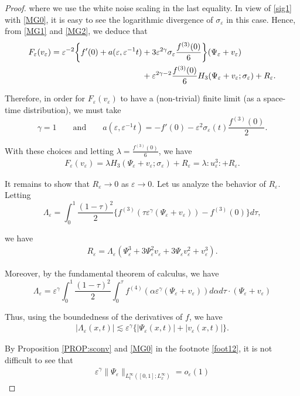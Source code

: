 \documentclass[letterpaper, 11pt,  reqno]{amsart}
\newcommand{\1}{\hspace{0.5mm}\text{I}\hspace{0.5mm}}
\newcommand{\noi}{\noindent}
\newcommand{\al}{\alpha}
\newcommand{\eps}{\varepsilon}
\newcommand{\g}{\gamma}
\newcommand{\ld}{\lambda}
\newcommand{\Ld}{\Lambda}
\newcommand{\s}{\sigma}
\newcommand{\les}{\lesssim}
\numberwithin{equation}{section}
\numberwithin{theorem}{section}
\begin{document}
\begin{proof}
{\noi
where we use the white noise scaling in the last equality.
In view of \eqref{sig1} with \eqref{MG0}, it is easy to see 
the logarithmic divergence of $\s_\eps$ in this case.}
Hence, from \eqref{MG1} and \eqref{MG2}, we deduce that 
\begin{align*}
 F_{\eps} (v_{\eps}) = \eps^{- 2} \bigg\{ f' (0) + a (\eps, \eps^{-1} t) 
 & + 3 \eps^{2 \gamma} \sigma_{\eps}
\frac{f^{(3)} (0)}{6} \bigg\} (\Psi_{\eps} + v_{\eps}) \notag\\ 
& +\eps^{2 \gamma - 2}  \frac{f^{(3)} (0)}{6} H_3 (\Psi_{\eps} +v_{\eps}; \sigma_{\eps}) + R_{\eps}. 
\end{align*}

\noi
Therefore,  in order for $F_{\eps} (v_{\eps})$ to have a (non-trivial) 
finite limit (as a space-time distribution),  we must take
\[ \g = 1
   \qquad \text{and}\qquad 
   a (\eps, \eps^{-1} t) = - f' (0) - \eps^{2}
   \sigma_{\eps} (t) \frac{f^{(3)} (0)}{2}. \]


\noi
With these choices and letting 
$\ld =\frac{f^{(3)} (0)}{6} $,  we have
\begin{align*}
 F_{\eps} (v_{\eps}) 
= \lambda H_3 (\Psi_{\eps} +   v_{\eps}; \sigma_{\eps}) + R_\eps
 = \ld  :\! u_\eps^3\!: + R_\eps. 
\end{align*}


It remains to show that $R_\eps \to 0$ as $\eps \to 0$.
Let us analyze the behavior of $R_{\eps}$. Letting
\[ \Ld_\eps = \int_0^1 \frac{(1 - \tau)^2}{2}  \big\{f^{(3)} (\tau
   \eps^\g (\Psi_{\eps} + v_{\eps})) - f^{(3)} (0)\big\}
d \tau, \]

\noi
we have
\begin{align}
	 R_{\eps} = \Lambda_{\eps}  (\Psi_{\eps}^3 + 3
   \Psi_{\eps}^2 v_{\eps} + 3 \Psi_{\eps}
   v_{\eps}^2 + v_{\eps}^3). 
\label{MG4}
\end{align}

\noi
Moreover, by the fundamental theorem of calculus, we have
\[ \Ld_\eps = \eps^\g \int_0^1 \frac{(1 -   \tau)^2}{2} 
\int_0^\tau f^{(4)} (\al  \eps^{\gamma} (\Psi_{\eps} +   v_{\eps}))d\al d \tau 
\cdot (\Psi_{\eps} + v_{\eps}) \]

\noi
Thus, using the boundedness of the derivatives of $f$,  we have
\begin{align} 
| \Ld_\eps (x, t) | \les \eps^{\gamma} 
\big\{|    \Psi_{\eps} (x, t) | + | v_{\eps} (x, t) |\big\} . 
\label{MG5}
\end{align}


By Proposition \ref{PROP:sconv} and \eqref{MG0} in the footnote \ref{foot12}, 
 it is not difficult to see that
\begin{align}
 \eps^{\gamma} \| \Psi_{\eps} \|_{L^{\infty}_t([0, 1]; L^\infty_x)} =
 o_{\eps} (1) 
\label{MG6}
\end{align}


\end{proof}
\end{document}
